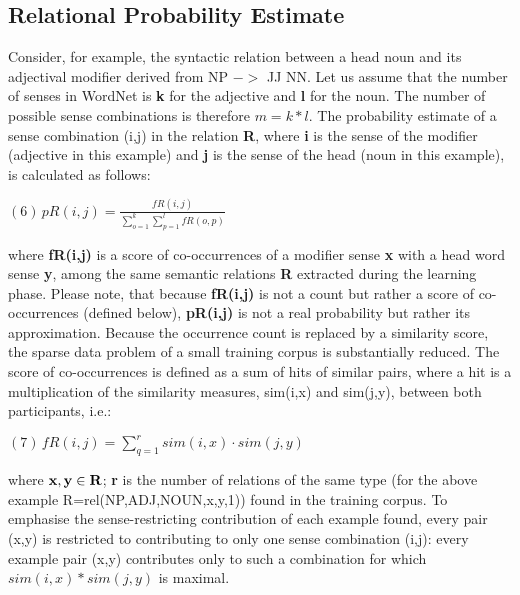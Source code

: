 \subsection{Relational Probability Estimate}
Consider, for example, the syntactic relation between a head noun and its adjectival modifier derived from NP $->$ JJ NN. Let us assume that the number of senses in WordNet is {\bf k} for the adjective and {\bf l} for the noun. The number of possible sense combinations is therefore $m=k*l$. The probability estimate of a sense combination (i,j) in the relation {\bf R}, where {\bf i} is the sense of the modifier (adjective in this example) and {\bf j} is the sense of the head (noun in this example), is calculated as follows:
\begin{center}
$(6) \,  \displaystyle pR(i,j)=\frac{fR(i,j)}{\displaystyle \sum_{o=1}^{k}\sum_{p=1}^{l}fR(o,p)}$
\end{center}
where {\bf fR(i,j)} is a score of co-occurrences of a modifier sense {\bf x} with a head word sense {\bf y}, among the same semantic relations {\bf R} extracted during the learning phase. Please note, that because {\bf fR(i,j)} is not a count but rather a score of co-occurrences (defined below), {\bf pR(i,j)} is not a real probability but rather its approximation. Because the occurrence count is replaced by a similarity score, the sparse data problem of a small training corpus is substantially reduced. The score of co-occurrences is defined as a sum of hits of similar pairs, where a hit is a multiplication of the similarity measures, sim(i,x) and sim(j,y), between both participants, i.e.:
\begin{center}
$(7) \, \displaystyle fR(i,j)=\sum_{q=1}^{r}sim(i,x) \cdot sim(j,y)$
\end{center}
where ${\bf x,y \in R}$; {\bf r} is the number of relations of the same type (for the above example R=rel(NP,ADJ,NOUN,x,y,1)) found in the training corpus. To emphasise the sense-restricting contribution of each example found, every pair (x,y) is restricted to contributing to only one sense combination (i,j): every example pair (x,y) contributes only to such a combination for which $sim(i,x)*sim(j,y)$ is maximal. 

